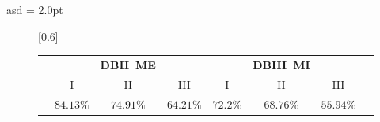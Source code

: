\documentclass[aspectratio=169]{beamer}
\begin{document}
\begin{frame}{asd}
    \nointerlineskip
\def \kerrwidth {0.15\linewidth}
\def \kerrwidthc {0.022\linewidth}
\def \kerrg {0.12\linewidth}
\def \kerrgg {0.05\linewidth}
\def \kerrggg {0.04\linewidth}
\tabcolsep = 2.0pt
\def\arraystretch{1.0}
\begin{figure}[h!]
\scalebox{0.6}[0.6]{\begin{tabular}{cccccccc}
\centering
& & \textbf{DBII~ME}& & & \textbf{DBIII~MI}&\\
\cmidrule{2-7}
& {I} & {II}&{III}&{I} & {II}&{III}&
\multirow{6}{*}{{\includegraphics[trim=660 0 0 0, clip,scale=0.35]{../Tesis_document/Figures/Objective_1/Cxsbj1hg-gaussacc95.28.eps}}}\\
\cmidrule{2-7}
& \textbf{$84.13\%$}& \textbf{$74.91\%$} & \textbf{$64.21\%$} & \textbf{$72.2\%$} & \textbf{$68.76\%$} & \textbf{$55.94\%$}&\\

\end{tabular}}
\end{figure}
\end{frame}
\end{document}
